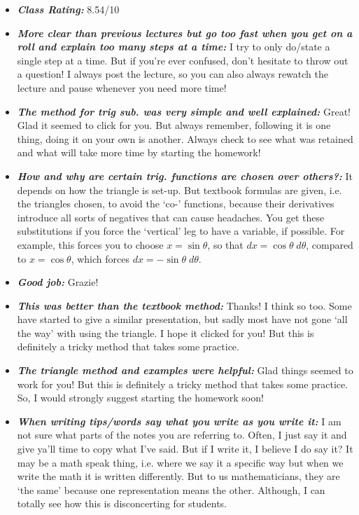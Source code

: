\documentclass[11pt,letterpaper]{article}
\begin{document}
\begin{itemize}
\item {\bfseries\itshape Class Rating:} 8.54/10

\item {\bfseries\itshape More clear than previous lectures but go too fast when you get on a roll and explain too many steps at a time:} I try to only do/state a single step at a time. But if you're ever confused, don't hesitate to throw out a question! I always post the lecture, so you can also always rewatch the lecture and pause whenever you need more time!

\item {\bfseries\itshape The method for trig sub. was very simple and well explained:} Great! Glad it seemed to click for you. But always remember, following it is one thing, doing it on your own is another. Always check to see what was retained and what will take more time by starting the homework!

\item {\bfseries\itshape How and why are certain trig. functions are chosen over others?:} It depends on how the triangle is set-up. But textbook formulas are given, i.e. the triangles chosen, to avoid the `co-' functions, because their derivatives introduce all sorts of negatives that can cause headaches. You get these substitutions if you force the `vertical' leg to have a variable, if possible. For example, this forces you to choose $x= \sin \theta$, so that $dx= \cos \theta \;d\theta$, compared to $x= \cos \theta$, which forces $dx= -\sin \theta \;d\theta$.

\item {\bfseries\itshape Good job:} Grazie!

\item {\bfseries\itshape This was better than the textbook method:} Thanks! I think so too. Some have started to give a similar presentation, but sadly most have not gone `all the way' with using the triangle. I hope it clicked for you! But this is definitely a tricky method that takes some practice. 

\item {\bfseries\itshape The triangle method and examples were helpful:} Glad things seemed to work for you! But this is definitely a tricky method that takes some practice. So, I would strongly suggest starting the homework soon!

\item {\bfseries\itshape When writing tips/words say what you write as you write it:} I am not sure what parts of the notes you are referring to. Often, I just say it and give ya'll time to copy what I've said. But if I write it, I believe I do say it? It may be a math speak thing, i.e. where we say it a specific way but when we write the math it is written differently. But to us mathematicians, they are `the same' because one representation means the other. Although, I can totally see how this is disconcerting for students.  


\end{itemize}
\end{document}
